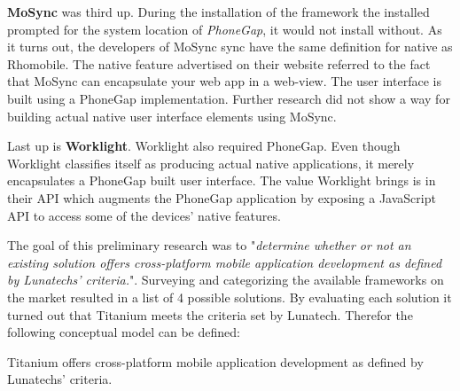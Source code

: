 {\bf MoSync} was third up. During the installation of the framework the installed prompted for the system location of \emph{PhoneGap}, it would not install without. As it turns out, the developers of MoSync sync have the same definition for native as Rhomobile. The native feature advertised on their website referred to the fact that MoSync can encapsulate your web app in a web-view. The user interface is built using a PhoneGap implementation. Further research did not show a way for building actual native user interface elements using MoSync.

Last up is {\bf Worklight}. Worklight also required PhoneGap. Even though Worklight classifies itself as producing actual native applications, it merely encapsulates a PhoneGap built user interface. The value Worklight brings is in their API which augments the PhoneGap application by exposing a JavaScript API to access some of the devices' native features.


The goal of this preliminary research was to "\emph{determine whether or not an existing solution offers cross-platform mobile application development as defined by Lunatechs' criteria.}".  Surveying and categorizing the available frameworks on the market resulted in a list of 4 possible solutions. By evaluating each solution it turned out that Titanium meets the criteria set by Lunatech. Therefor the following conceptual model can be defined:
\begin{shadequote}
Titanium offers cross-platform mobile application development as defined by Lunatechs' criteria.%
\end{shadequote}